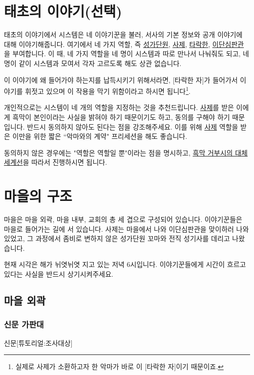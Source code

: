 \documentclass{report}
\begin{document}
	\section{태초의 이야기(선택)}
		태초의 이야기에서 시스템은 네 이야기꾼을 불러, 서사의 기본 정보와 공개 이야기에 대해 이야기해줍니다. 여기에서 네 가지 역할, 즉 \hyperlink{cursed-bard}{성가단원}, \hyperlink{cowardly-priest}{사제}, \hyperlink{corrupt-paladin}{타락한}, \hyperlink{hurt-rogue}{이단심판관}을 부여합니다. 이 때, 네 가지 역할을 네 명이 시스템과 따로 만나서 나눠줘도 되고, 네명이 같이 시스템과 모여서 각자 고르도록 해도 상관 없습니다.
		
		이 이야기에 왜 들어가야 하는지를 납득시키기 위해서라면, [타락한 자]가 들어가서 이야기를 휘젓고 있으며 이 작용을 막기 위함이라고 하시면 됩니다\footnote{실제로 사제가 소환하고자 한 악마가 바로 이 [타락한 자]이기 때문이죠.}.
		
		개인적으로는 시스템이 네 개의 역할을 지정하는 것을 추천드립니다. \hyperlink{cowardly-priest}{사제}를 받은 이에게 흑막이 본인이라는 사실을 밝혀야 하기 때문이기도 하고, 동의를 구해야 하기 때문입니다. 반드시 동의하지 않아도 된다는 점을 강조해주세요. 이를 위해 \hyperlink{cowardly-priest}{사제} 역할을 받은 이만을 위한 짧은 ``악마와의 계약" 프리세션을 해도 좋습니다.
		
		동의하지 않은 경우에는 "역할은 역할일 뿐"이라는 점을 명시하고, \hyperlink{alternative:no-criminal}{흑막 거부시의 대체 세계선}을 따라서 진행하시면 됩니다.
	
	\section{마을의 구조}
		마을은 마을 외곽, 마을 내부, 교회의 총 세 겹으로 구성되어 있습니다. 이야기꾼들은 마을로 들어가는 길에 서 있습니다. 사제는 마을에서 나와 이단심판관을 맞이하러 나와있었고, 그 과정에서 좀비로 변하지 않은 성가단원 꼬마와 전직 성기사를 데리고 나왔습니다.
		
		현재 시각은 해가 뉘엿뉘엿 지고 있는 저녁 6시입니다. 이야기꾼들에게 시간이 흐르고 있다는 사실을 반드시 상기시켜주세요.
		
			\subsection{마을 외곽}
				\hypertarget{search:newspaper-stand}{}
				\subsubsection*{신문 가판대}
					\begin{spoiler}{신문}{[튜토리얼:조사대상]}
						
						
					\end{spoiler}
				
\end{document}
